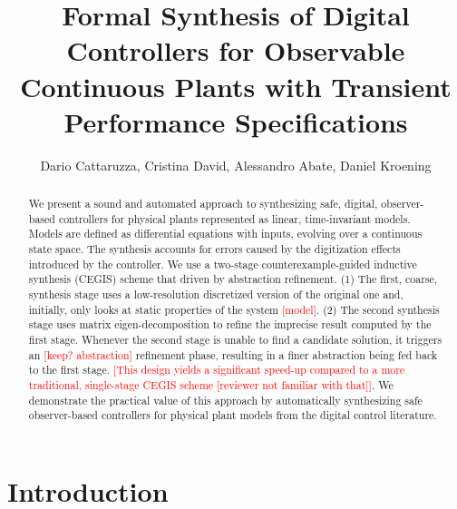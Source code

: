 \documentclass[sigconf]{llncs}
\renewcommand{\note}[1]{\textcolor{red}{[#1]}}
\begin{document}
\title{Formal Synthesis of Digital Controllers for Observable Continuous
Plants with Transient Performance Specifications}

\author{Dario Cattaruzza, Cristina David, Alessandro Abate, Daniel Kroening}%



\maketitle


\begin{abstract} 
%
We present a sound and automated approach to synthesizing safe,
digital, observer-based controllers for physical plants represented as
linear, time-invariant models.  Models are defined as differential 
equations with inputs, evolving over a continuous state space. The synthesis 
accounts for errors caused by the digitization effects introduced by the
controller.  We use a two-stage counterexample-guided inductive
synthesis (CEGIS) scheme that driven by abstraction refinement. (1) The first,
coarse, synthesis stage uses a low-resolution discretized version of the
original one and, initially, only looks at static properties of the
system \note{model}.  (2) The second synthesis stage uses matrix eigen-decomposition to
refine the imprecise result computed by the first stage.  Whenever the
second stage is unable to find a candidate solution, it triggers an
\note{keep? abstraction} refinement phase, resulting in a finer abstraction being
fed back to the first stage. \note{This design yields a significant
speed-up compared to a more traditional, single-stage CEGIS scheme [reviewer not familiar with that]}.  
We demonstrate the practical value of this approach by automatically synthesizing
safe observer-based controllers for physical plant models from the
digital control literature.
%
\end{abstract}

\section{Introduction}
\end{document}
